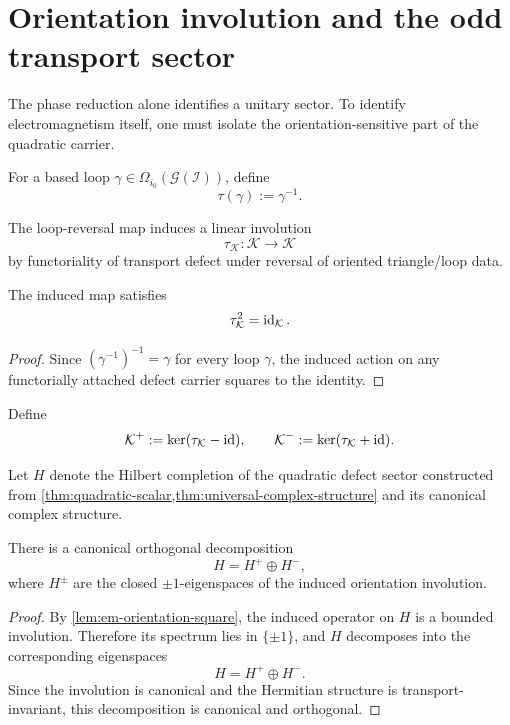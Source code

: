 \section{Orientation involution and the odd transport sector}
\label{sec:em-orientation-odd}
The phase reduction alone identifies a unitary sector.
To identify electromagnetism itself, one must isolate the
orientation-sensitive part of the quadratic carrier.
\begin{definition}
	For a based loop \(\gamma\in\Omega_{i_0}(\mathcal G(\mathcal I))\), define
	\[
		\tau(\gamma):=\gamma^{-1}.
	\]
\end{definition}
\begin{definition}
	The loop-reversal map induces a linear involution
	\[
		\tau_{\mathcal K}:\mathcal K\to\mathcal K
	\]
	by functoriality of transport defect under reversal of oriented
	triangle/loop data.
\end{definition}
\begin{lemma}
	\label{lem:em-orientation-square}
	The induced map satisfies
	\[
		\tau_{\mathcal K}^2=\operatorname{id}_{\mathcal K}.
	\]
\end{lemma}
\begin{proof}
	Since \((\gamma^{-1})^{-1}=\gamma\) for every loop \(\gamma\), the
	induced action on any functorially attached defect carrier squares to
	the identity.
\end{proof}
\begin{definition}
	Define
	\[
		\mathcal K^+ := \ker(\tau_{\mathcal K}-\operatorname{id}),
		\qquad
		\mathcal K^- := \ker(\tau_{\mathcal K}+\operatorname{id}).
	\]
\end{definition}
Let \(H\) denote the Hilbert completion of the quadratic defect sector
constructed from
\cref{thm:quadratic-scalar,thm:universal-complex-structure}
and its canonical
complex structure.
\begin{theorem}
	There is a canonical orthogonal decomposition
	\[
		H = H^+ \oplus H^-,
	\]
	where \(H^\pm\) are the closed \(\pm1\)-eigenspaces of the induced
	orientation involution.
\end{theorem}
\begin{proof}
	By \cref{lem:em-orientation-square}, the induced operator on \(H\) is a
	bounded involution.
	Therefore its spectrum lies in \(\{\pm1\}\), and \(H\) decomposes into
	the corresponding eigenspaces
	\[
		H=H^+\oplus H^-.
	\]
	Since the involution is canonical and the Hermitian structure is
	transport-invariant, this decomposition is canonical and orthogonal.
\end{proof}
